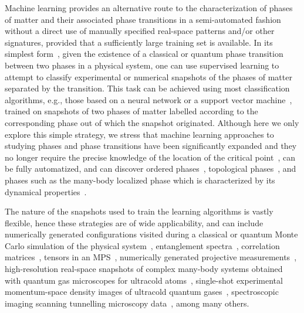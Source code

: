 \documentclass[twocolumn,english,reprint,superscriptaddress,longbibliography,pra]{revtex4-1}
\begin{document}
Machine learning provides an alternative route to the characterization of phases of matter and their associated phase transitions in a semi-automated fashion without a direct use of manually specified real-space patterns and/or other signatures, provided that a sufficiently large training set is available. In its simplest form~\cite{carrasquilla2017nature}, given the existence of a classical or quantum phase transition between two phases in a physical system, one can use supervised learning to attempt to classify experimental or numerical snapshots of the phases of matter separated by the transition. This task can be achieved using most classification algorithms, e.g., those based on a neural network or a support vector machine~\cite{10.5555/1162264}, trained on snapshots of two phases of matter labelled according to the corresponding phase out of which the snapshot originated. Although here we only explore this simple strategy, we stress that machine learning approaches to studying phases and phase transitions have been significantly expanded and they no longer require the precise knowledge of the location of the critical point~\cite{evert2017nature,broecker2017b}, can be fully automatized, and can discover ordered phases~\cite{carrasquilla2017nature,leiwang2016,PhysRevE.96.022140}, topological phases~\cite{evert2017nature,rodriguez-nieva2019,PhysRevLett.125.127401}, and phases such as the many-body localized phase which is characterized by its dynamical properties~\cite{yi-ting2018,rao2018,PhysRevLett.120.257204}.  

The nature of the snapshots used to train the learning algorithms is vastly flexible, hence these strategies are of wide applicability, and can include numerically generated configurations visited during a classical or quantum Monte Carlo simulation of the physical system~\cite{carrasquilla2017nature,leiwang2016,evert2017nature,broecker2017,chng2017,PhysRevB.99.060404,PhysRevB.99.121104}, entanglement spectra~\cite{evert2017nature,yi-ting2018}, correlation matrices~\cite{PhysRevB.102.054512,PhysRevLett.125.170603}, tensors in an MPS~\cite{PhysRevLett.125.170603}, numerically generated projective measurements~\cite{berezutskii2020}, high-resolution real-space snapshots of complex many-body systems obtained with quantum gas microscopes for ultracold atoms~\cite{Bohrdt2018,PhysRevA.102.033326}, single-shot experimental momentum-space density images of ultracold quantum gases~\cite{Rem2018}, spectroscopic imaging scanning tunnelling microscopy data~\cite{Zhang_MLcuprates}, among many others. 
\end{document}
